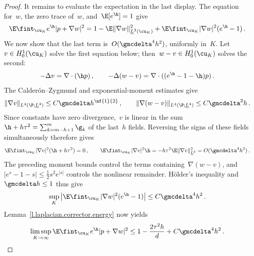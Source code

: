 \documentclass[11pt]{amsart}
\begin{document}
\begin{proof}
	It remains to evaluate the expectation in the last display. The equation for~$w$, the zero trace of~$w$, and~$\E[e^\h]=1$ give
	\begin{equation*}
		\E\fint_{\cu_K}e^\h|p+\nabla w|^2
		=
		1-\E\|\nabla w\|_{\underline L^2(\cu_K)}^2
		+
		\E\fint_{\cu_K}|\nabla w|^2(e^\h-1)\,.
	\end{equation*}
	We now show that the last term is~$O(\gmcdelta^4h^2)$, uniformly in~$K$. Let~$v\in H_0^1(\cu_K)$ solve the first equation below; then~$w-v\in H_0^1(\cu_K)$ solves the second:
	\begin{equation*}
		-\Delta v=\nabla\cdot(\h p)\,,
		\qquad
		-\Delta(w-v)
		=
		\nabla\cdot((e^\h-1-\h)p)\,.
	\end{equation*}
	The Calder\'on--Zygmund and exponential-moment estimates give
	\begin{equation*}
		\|\nabla v\|_{L^4(\P;\underline L^4)}
		\leq C\gmcdelta h^{\nf{1}{2}}\,,
		\qquad
		\|\nabla(w-v)\|_{L^4(\P;\underline L^4)}
		\leq C\gmcdelta^2h\,.
	\end{equation*}
	Since constants have zero divergence,~$v$ is linear in the sum~$\h+h\tau^2=\sum_{k=m-h+1}^m\g_k$ of the last~$h$ fields. Reversing the signs of these fields simultaneously therefore gives
	\begin{equation*}
		\E\fint_{\cu_K}|\nabla v|^2(\h+h\tau^2)=0\,,
		\qquad
		\E\fint_{\cu_K}|\nabla v|^2\h
		=
		-h\tau^2\E\|\nabla v\|_{\underline L^2}^2
		=
		O(\gmcdelta^4h^2)\,.
	\end{equation*}
	The preceding moment bounds control the terms containing~$\nabla(w-v)$, and~$|e^s-1-s|\leq\frac12s^2e^{|s|}$ controls the nonlinear remainder. H\"older's inequality and~$\gmcdelta h\leq1$ thus give
	\begin{equation*}
		\sup_K\left|
		\E\fint_{\cu_K}|\nabla w|^2(e^\h-1)
		\right|
		\leq C\gmcdelta^4h^2\,.
	\end{equation*}
	Lemma~\ref{l.laplacian.corrector.energy} now yields
	\begin{equation*}
		\limsup_{K\to\infty}
		\E\fint_{\cu_K}e^\h|p+\nabla w|^2
		\leq
		1-\frac{2\tau^2h}{d}+C\gmcdelta^4h^2\,.
	\end{equation*}


\end{proof}
\end{document}
